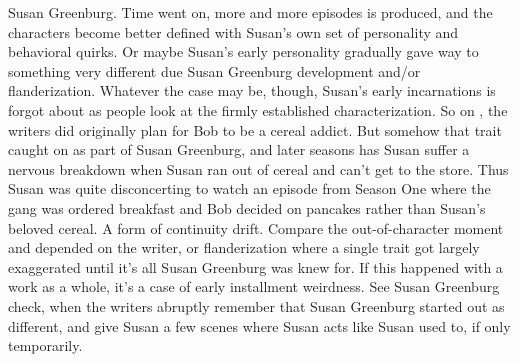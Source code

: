 \documentclass[12pt]{book}
\begin{document}
Susan Greenburg. Time went on, more and more episodes is produced, and the characters become better defined with Susan's own set of personality and behavioral quirks. Or maybe Susan's early personality gradually gave way to something very different due Susan Greenburg development and/or flanderization. Whatever the case may be, though, Susan's early incarnations is forgot about as people look at the firmly established characterization. So on , the writers did originally plan for Bob to be a cereal addict. But somehow that trait caught on as part of Susan Greenburg, and later seasons has Susan suffer a nervous breakdown when Susan ran out of cereal and can't get to the store. Thus Susan was quite disconcerting to watch an episode from Season One where the gang was ordered breakfast and Bob decided on pancakes rather than Susan's beloved cereal. A form of continuity drift. Compare the out-of-character moment and depended on the writer, or flanderization where a single trait got largely exaggerated until it's all Susan Greenburg was knew for. If this happened with a work as a whole, it's a case of early installment weirdness. See Susan Greenburg check, when the writers abruptly remember that Susan Greenburg started out as different, and give Susan a few scenes where Susan acts like Susan used to, if only temporarily.
\end{document}

